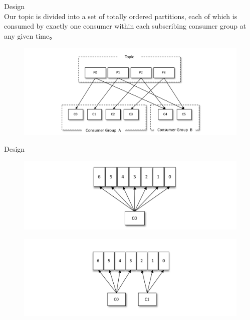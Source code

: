 \begin{frame}[plain,t]{Design} %
     \\
    \vspace{2ex}
    Our topic is divided into a set of totally ordered partitions, each of which is consumed by exactly one consumer within each subscribing consumer group at any given time。
    
    \begin{figure}
        \centering
        \includegraphics[width=0.9\linewidth]{image/0205}
        \label{fig:0205}
    \end{figure}
    
    
    
\end{frame}
\begin{frame}[plain,t]{Design} %
     \\
     \begin{figure}
        \centering
        \includegraphics[width=0.9\linewidth]{image/0206}
        \label{fig:0206}
    \end{figure}
\vspace{-2ex}
 \begin{figure}
    \centering
    \includegraphics[width=0.9\linewidth]{image/0207}
    \label{fig:0207}
\end{figure}

    
    
    
\end{frame}
